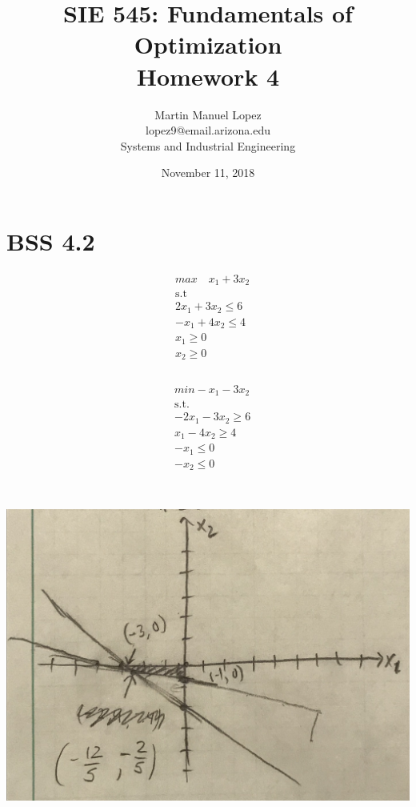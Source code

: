 \documentclass[12pt]{article}
\begin{document}
\title{SIE 545: Fundamentals of Optimization \\Homework 4}
\author{Martin Manuel Lopez \\lopez9@email.arizona.edu \\Systems and Industrial Engineering}
\date{November 11, 2018}
\maketitle
\section{BSS 4.2}   
    \begin{align*}
        &max \quad x_1+3x_2 \\
        &\text{s.t} \\
        &2x_1 + 3x_2 \leq 6\\
        &-x_1 + 4x_2 \leq 4\\
        &x_1 \geq 0\\
        &x_2 \geq 0\\
    \end{align*}
    \\
    \begin{align*}
        &min -x_1 - 3x_2\\
        &\text{s.t.}\\
        &-2x_1-3x_2 \geq 6\\
        &x_1 -4x_2 \geq 4\\
        &-x_1 \leq 0 \\
        &-x_2 \leq 0\\
    \end{align*}\\
    \\
    \includegraphics[width=\textwidth]{BSS4-2.jpeg}\\
\end{document}
